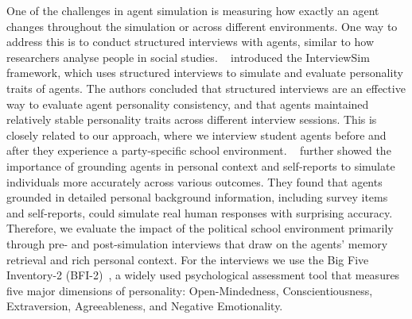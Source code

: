 One of the challenges in agent simulation is measuring how exactly an agent changes throughout the simulation or across different environments. One way to address this is to conduct structured interviews with agents, similar to how researchers analyse people in social studies. \citeauthor{li:2026}~\cite{li:2026} introduced the InterviewSim framework, which uses structured interviews to simulate and evaluate personality traits of agents. The authors concluded that structured interviews are an effective way to evaluate agent personality consistency, and that agents maintained relatively stable personality traits across different interview sessions. This is closely related to our approach, where we interview student agents before and after they experience a party-specific school environment. \citeauthor{park:2023}~\cite{park:2023} further showed the importance of grounding agents in personal context and self-reports to simulate individuals more accurately across various outcomes. They found that agents grounded in detailed personal background information, including survey items and self-reports, could simulate real human responses with surprising accuracy. Therefore, we evaluate the impact of the political school environment primarily through pre- and post-simulation interviews that draw on the agents' memory retrieval and rich personal context. For the interviews we use the Big Five Inventory-2 (BFI-2)~\cite{soto:2017}, a widely used psychological assessment tool that measures five major dimensions of personality: Open-Mindedness, Conscientiousness, Extraversion, Agreeableness, and Negative Emotionality.